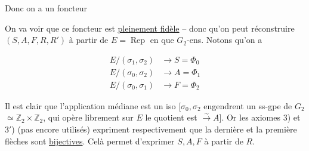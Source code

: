 
Donc on a un foncteur


On va voir que  ce foncteur est \uline{pleinement fidèle} -- donc qu'on peut réconstruire $(S,A,F,R,R')$ à partir de $E=\operatorname{Rep}$ en  que $G_2$-ens. Notons qu'on a

\[
\begin{aligned}
 E/(\sigma_1,\sigma_2)&\longrightarrow S=\Phi_0\\
 E/(\sigma_0,\sigma_2)&\longrightarrow A=\Phi_1\\
 E/(\sigma_0,\sigma_1)&\longrightarrow F=\Phi_2
\end{aligned}
\]


Il est clair que l'application médiane est un iso [$\sigma_0,\sigma_2$ engendrent un ss-gpe de $G_2$ $\simeq\mathbb Z_2\times\mathbb Z_2$, qui opère librement sur $E$  le quotient est $\xrightarrow{\sim} A$]. Or les axiomes 3) et 3$'$) (pas encore utilisés) expriment respectivement  que la dernière et la première flèches sont  \uline{bijectives}. Celà permet d'exprimer $S,A,F$ à partir de $R$.


